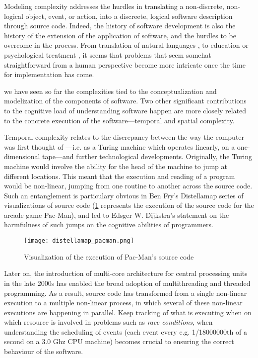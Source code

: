 Modeling complexity addresses the hurdles in translating a non-discrete, non-logical object, event, or action, into a discreete, logical software description through source code. Indeed, the history of software development is also the history of the extension of the application of software, and the hurdles to be overcome in the process. From translation of natural languages \citep{poibeau_machine_2017}, to education \citep{watters_teaching_2021} or psychological treatment \citep{weizenbaum_computer_1976}, it seems that problems that seem somehat straightforward from a human perspective become more intricate once the time for implementation has come.

we have seen so far the complexities tied to the conceptualization and modelization of the components of software. Two other significant contributions to the cognitive load of understanding software happen are more closely related to the concrete execution of the software—temporal and spatial complexity.

Temporal complexity relates to the discrepancy between the way the computer was first thought of —i.e. as a Turing machine which operates linearly, on a one-dimensional tape—and further technological developments. Originally, the Turing machine would involve the ability for the head of the machine to jump at different locations. This meant that the execution and reading of a program would be non-linear, jumping from one routine to another across the source code. Such an entanglement is particulary obvious in Ben Fry's Distellamap series of visualizations of source code (\ref{graphic:pacman-visualization} represents the execution of the source code for the arcade game Pac-Man), and led to Edsger W. Dijkstra's statement on the harmfulness of such jumps on the cognitive abilities of programmers.


\begin{figure}
    \texttt{[image: distellamap\_pacman.png]}
    \caption{Visualization of the execution of Pac-Man's source code}
    \label{graphic:pacman-visualization}
\end{figure}

Later on, the introduction of multi-core architecture for central processing units in the late 2000s has enabled the broad adoption of multithreading and threaded programming. As a result, source code has transformed from a single non-linear execution to a multiple non-linear process, in which several of these non-linear executions are happening in parallel. Keep tracking of what is executing when on which resource is involved in problems such as \emph{race conditions}, when understanding the scheduling of events (each event every e.g. 1/18000000th of a second on a 3.0 Ghz CPU machine) becomes crucial to ensuring the correct behaviour of the software.


